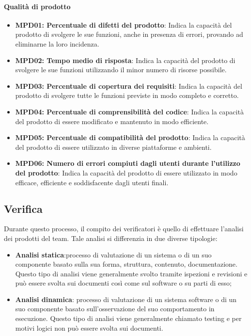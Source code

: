 \documentclass[12pt]{article}
\begin{document}
\paragraph{Qualità di prodotto}
\begin{itemize}
    \item \textbf{MPD01: Percentuale di difetti del prodotto}: Indica la capacità del prodotto di svolgere le sue funzioni, anche in presenza
          di errori, provando ad eliminarne la loro incidenza.

    \item \textbf{MPD02: Tempo medio di risposta}: Indica la capacità del prodotto di svolgere le sue funzioni utilizzando il minor
          numero di risorse possibile.

    \item \textbf{MPD03: Percentuale di copertura dei requisiti}: Indica la capacità del prodotto di svolgere tutte le funzioni previste in modo
          completo e corretto.

    \item \textbf{MPD04: Percentuale di comprensibilità del codice}: Indica la capacità del prodotto di essere modificato e mantenuto in modo
          efficiente.

    \item \textbf{MPD05: Percentuale di compatibilità del prodotto}: Indica la capacità del prodotto di essere utilizzato in diverse piattaforme e
          ambienti.

    \item \textbf{MPD06: Numero di errori compiuti dagli utenti durante l’utilizzo del
              prodotto}: Indica la capacità del prodotto di essere utilizzato in modo efficace, efficiente
          e soddisfacente dagli utenti finali.


\end{itemize}


\subsection{Verifica}
Durante questo processo, il compito dei verificatori è quello di effettuare l’analisi dei prodotti del team.
Tale analisi si differenzia in due diverse tipologie:
\begin{itemize}
    \item \textbf{Analisi statica}:processo di valutazione di un sistema o di un suo componente basato sulla sua
          forma, struttura, contenuto, documentazione. Questo tipo di analisi viene generalmente svolto
          tramite ispezioni e revisioni e può essere svolta sui documenti così come sul software o su parti
          di esso;

    \item \textbf{Analisi dinamica}: processo di valutazione di un sistema software o di un suo componente
          basato sull’osservazione del suo comportamento in esecuzione. Questo tipo di analisi viene
          generalmente chiamato testing e per motivi logici non può essere svolta sui documenti.
\end{itemize}
\end{document}
